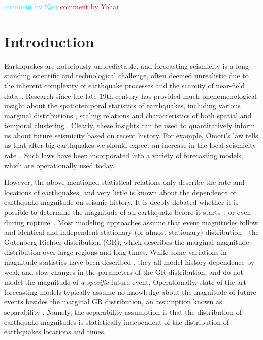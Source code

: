 \documentclass[pdflatex]{sn-jnl}
\newcommand{\yohai}[1]{{\textcolor{red}{#1}}}
\newcommand{\neri}[1]{{\textcolor{cyan}{#1}}}
\begin{document}
\maketitle

\neri{comment by Neri} \newline
\yohai{comment by Yohai}


\section{Introduction} \label{sec:introduction}
Earthquakes are notoriously unpredictable, and forecasting seismicity is a long-standing scientific and technological challenge, often deemed unrealistic due to the inherent complexity of earthquake processes and the scarcity of near-field data~\cite{bernard_earthquake_1999, geller_earthquakes_1997}. 
Research since the late 19th century has provided much phenomenological insight about the spatiotemporal statistics of earthquakes, including various marginal distributions \cite{gutenberg_frequency_1944, kagan_seismic_2002}, scaling relations \cite{bak_earthquakes_1989, dascher-cousineau_what_2020, kagan_aftershock_2002, utsu_centenary_1995} and characteristics of both spatial and temporal clustering \cite{omori_after-shocks_1894, kagan_short-term_2004, ben-zion_localization_2020, devries_deep_2018, king_static_1994}. Clearly, these insights can be used to quantitatively inform us about future seismicity based on recent history. For example, Omori's law tells us that after big earthquakes we should expect an increase in the local seismicity rate~\cite{omori_after-shocks_1894}. Such laws have been incorporated into a variety of forecasting models, which are operationally used today\cite{ogata_statistical_1988, hardebeck_aftershock_2024, jordan_operational_2011, stirling_national_2012}.

However, the above mentioned statistical relations only describe the rate and locations of earthquakes, and very little is known about the dependence of earthquake magnitude on seismic history.
It is deeply debated whether it is possible to determine the magnitude of an earthquake before it starts~\cite{kagan_seismic_2002, ogata_exploring_2018}, or even during rupture~\cite{ellsworth_seismic_1995, meier_evidence_2016}.
Most modeling approaches assume that event magnitudes follow and identical and independent stationary (or almost stationary) distribution - the Gutenberg Richter distribution (GR), which describes the marginal magnitude distribution over large regions and long times. 
While some variations in magnitude statistics have been described \cite{gulia_real-time_2019, nandan_magnitude_2019}, they all model history dependence by weak and slow changes in the parameters of the GR distribution, and do not model the magnitude of \textit{a specific} future event. Operationally, state-of-the-art forecasting models typically assume no knowledge about the magnitude of future events besides the marginal GR distribution, an assumption known as separability \cite{schoenberg_testing_2004}. Namely, the separability assumption is that the distribution of earthquake magnitudes is statistically independent of the distribution of earthquakes locations and times.
\end{document}
